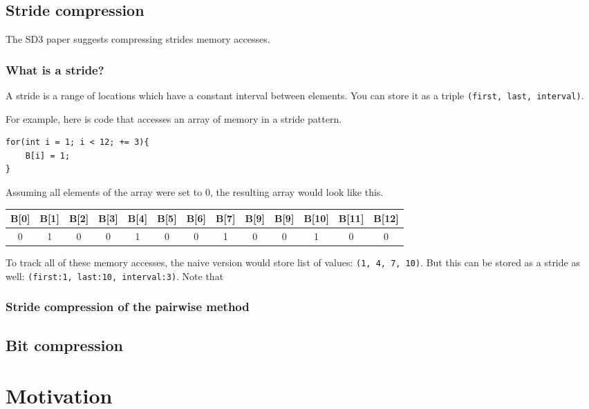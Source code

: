 \documentclass[12pt,twoside]{reedthesis}
\begin{document}
		\subsection{Stride compression}
		
		The SD3 paper suggests compressing strides memory accesses.
		
		\subsubsection{What is a stride?}
		
		A stride is a range of locations which have a constant interval between elements. You can store it as a triple \texttt{(first, last, interval)}.
		
		For example, here is code that accesses an array of memory in a stride pattern. 
		
		\begin{lstlisting}
for(int i = 1; i < 12; += 3){
	B[i] = 1;
}
		\end{lstlisting}
		
		Assuming all elements of the array were set to 0, the resulting array would look like this.
		
		\begin{tabular}{ |c|c|c|c|c|c|c|c|c|c|c|c|c| } 
			\hline
			B[0] & B[1] & B[2] & B[3] & B[4] & B[5] & B[6] & B[7] & B[9] & B[9] & B[10] & B[11] & B[12] \\
			\hline
			0 & 1 & 0 & 0 & 1 & 0 & 0 & 1 & 0 & 0 & 1 & 0 & 0 \\
			\hline
		\end{tabular}
		
		To track all of these memory accesses, the naive version would store list of values: \texttt{(1, 4, 7, 10)}. But this can be stored as a stride as well: \texttt{(first:1, last:10, interval:3)}. Note that 
		
		\subsubsection{Stride compression of the pairwise method}
		
		
		\subsection{Bit compression}
		
		
		
			
	\section{Motivation}
	
\end{document}
